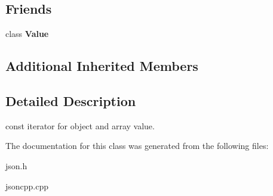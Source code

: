 \subsection*{Friends}
\begin{DoxyCompactItemize}
\item 
\hypertarget{class_json_1_1_value_const_iterator_aeceedf6e1a7d48a588516ce2b1983d6f}{class {\bfseries Value}}\label{class_json_1_1_value_const_iterator_aeceedf6e1a7d48a588516ce2b1983d6f}

\end{DoxyCompactItemize}
\subsection*{Additional Inherited Members}


\subsection{Detailed Description}
const iterator for object and array value. 



The documentation for this class was generated from the following files\-:\begin{DoxyCompactItemize}
\item 
json.\-h\item 
jsoncpp.\-cpp\end{DoxyCompactItemize}
